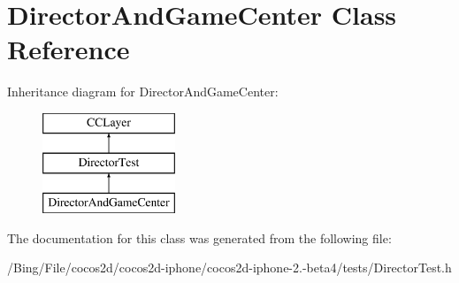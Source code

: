 \hypertarget{interface_director_and_game_center}{\section{Director\-And\-Game\-Center Class Reference}
\label{interface_director_and_game_center}
}
Inheritance diagram for Director\-And\-Game\-Center\-:\begin{figure}[H]
\begin{center}
\leavevmode
\includegraphics[height=3.000000cm]{interface_director_and_game_center}
\end{center}
\end{figure}


The documentation for this class was generated from the following file\-:\begin{DoxyCompactItemize}
\item 
/\-Bing/\-File/cocos2d/cocos2d-\/iphone/cocos2d-\/iphone-\/2.-\/beta4/tests/Director\-Test.\-h\end{DoxyCompactItemize}
